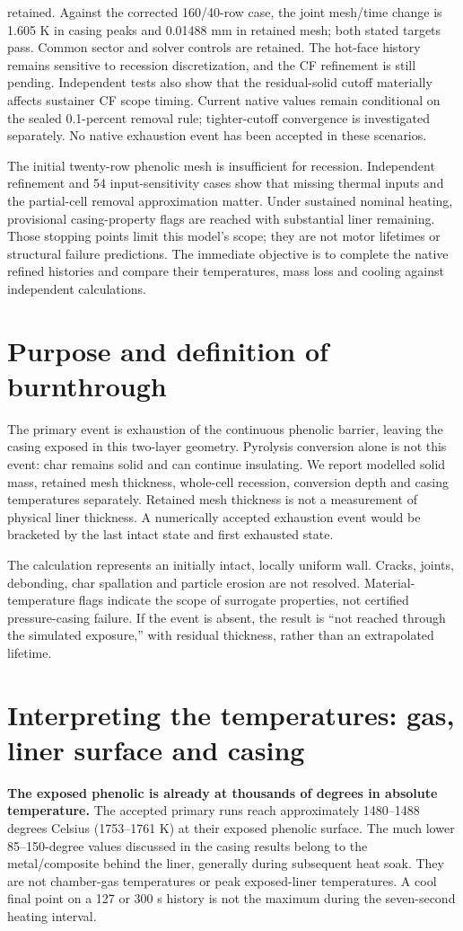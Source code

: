 \documentclass[oneside,openany]{amsdtx}
\begin{document}
retained. Against the corrected 160/40-row case, the joint mesh/time change is 1.605 K in casing peaks and 0.01488 mm in retained mesh; both stated targets pass. Common sector and solver controls are retained. The hot-face history remains sensitive to recession discretization, and the CF refinement is still pending. Independent tests also show that the residual-solid cutoff materially affects sustainer CF scope timing. Current native values remain conditional on the sealed 0.1-percent removal rule; tighter-cutoff convergence is investigated separately. No native exhaustion event has been accepted in these scenarios.

The initial twenty-row phenolic mesh is insufficient for recession. Independent refinement and 54 input-sensitivity cases show that missing thermal inputs and the partial-cell removal approximation matter. Under sustained nominal heating, provisional casing-property flags are reached with substantial liner remaining. Those stopping points limit this model's scope; they are not motor lifetimes or structural failure predictions. The immediate objective is to complete the native refined histories and compare their temperatures, mass loss and cooling against independent calculations.

\section{Purpose and definition of burnthrough}
The primary event is exhaustion of the continuous phenolic barrier, leaving the casing exposed in this two-layer geometry. Pyrolysis conversion alone is not this event: char remains solid and can continue insulating. We report modelled solid mass, retained mesh thickness, whole-cell recession, conversion depth and casing temperatures separately. Retained mesh thickness is not a measurement of physical liner thickness. A numerically accepted exhaustion event would be bracketed by the last intact state and first exhausted state.

The calculation represents an initially intact, locally uniform wall. Cracks, joints, debonding, char spallation and particle erosion are not resolved. Material-temperature flags indicate the scope of surrogate properties, not certified pressure-casing failure. If the event is absent, the result is ``not reached through the simulated exposure,'' with residual thickness, rather than an extrapolated lifetime.

\section{Interpreting the temperatures: gas, liner surface and casing}
\label{sec:temperature-locations}
\textbf{The exposed phenolic is already at thousands of degrees in absolute temperature.} The accepted primary runs reach approximately 1480--1488 degrees Celsius (1753--1761 K) at their exposed phenolic surface. The much lower 85--150-degree values discussed in the casing results belong to the metal/composite behind the liner, generally during subsequent heat soak. They are not chamber-gas temperatures or peak exposed-liner temperatures. A cool final point on a 127 or 300 s history is not the maximum during the seven-second heating interval.
\end{document}

